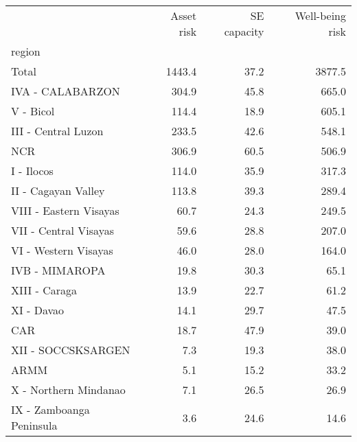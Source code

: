 \begin{tabular}{lrrr}
\toprule
{} &  Asset risk &  SE capacity &  Well-being risk \\
region                   &             &              &                  \\
\midrule
Total                    &      1443.4 &         37.2 &           3877.5 \\
IVA - CALABARZON         &       304.9 &         45.8 &            665.0 \\
V - Bicol                &       114.4 &         18.9 &            605.1 \\
III - Central Luzon      &       233.5 &         42.6 &            548.1 \\
NCR                      &       306.9 &         60.5 &            506.9 \\
I - Ilocos               &       114.0 &         35.9 &            317.3 \\
II - Cagayan Valley      &       113.8 &         39.3 &            289.4 \\
VIII - Eastern Visayas   &        60.7 &         24.3 &            249.5 \\
VII - Central Visayas    &        59.6 &         28.8 &            207.0 \\
VI - Western Visayas     &        46.0 &         28.0 &            164.0 \\
IVB - MIMAROPA           &        19.8 &         30.3 &             65.1 \\
XIII - Caraga            &        13.9 &         22.7 &             61.2 \\
XI - Davao               &        14.1 &         29.7 &             47.5 \\
CAR                      &        18.7 &         47.9 &             39.0 \\
XII - SOCCSKSARGEN       &         7.3 &         19.3 &             38.0 \\
ARMM                     &         5.1 &         15.2 &             33.2 \\
X - Northern Mindanao    &         7.1 &         26.5 &             26.9 \\
IX - Zamboanga Peninsula &         3.6 &         24.6 &             14.6 \\
\bottomrule
\end{tabular}
